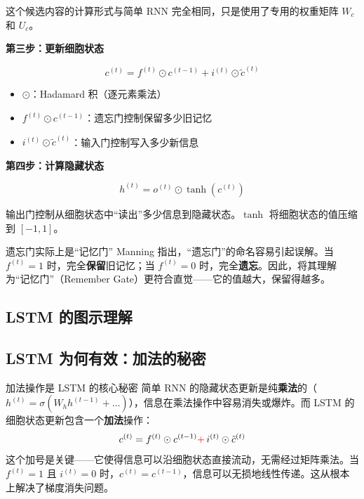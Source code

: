 \documentclass[a4paper]{article}
\begin{document}
这个候选内容的计算形式与简单 RNN 完全相同，只是使用了专用的权重矩阵 $W_c$ 和 $U_c$。

\textbf{第三步：更新细胞状态}

$$c^{(t)} = f^{(t)} \odot c^{(t-1)} + i^{(t)} \odot \tilde{c}^{(t)}$$

\begin{itemize}
    \item $\odot$：Hadamard 积（逐元素乘法）
    \item $f^{(t)} \odot c^{(t-1)}$：遗忘门控制保留多少旧记忆
    \item $i^{(t)} \odot \tilde{c}^{(t)}$：输入门控制写入多少新信息
\end{itemize}

\textbf{第四步：计算隐藏状态}

$$h^{(t)} = o^{(t)} \odot \tanh(c^{(t)})$$

输出门控制从细胞状态中``读出''多少信息到隐藏状态。$\tanh$ 将细胞状态的值压缩到 $[-1, 1]$。

\begin{warningbox}{遗忘门实际上是``记忆门''}
Manning 指出，``遗忘门''的命名容易引起误解。当 $f^{(t)} = 1$ 时，完全\textbf{保留}旧记忆；当 $f^{(t)} = 0$ 时，完全\textbf{遗忘}。因此，将其理解为``记忆门''（Remember Gate）更符合直觉——它的值越大，保留得越多。
\end{warningbox}

\subsection{LSTM 的图示理解}







\subsection{LSTM 为何有效：加法的秘密}

\begin{importantbox}{加法操作是 LSTM 的核心秘密}
简单 RNN 的隐藏状态更新是纯\textbf{乘法}的（$h^{(t)} = \sigma(W_h h^{(t-1)} + \ldots)$），信息在乘法操作中容易消失或爆炸。而 LSTM 的细胞状态更新包含一个\textbf{加法}操作：
$$c^{(t)} = f^{(t)} \odot c^{(t-1)} \textcolor{red}{+} \, i^{(t)} \odot \tilde{c}^{(t)}$$
这个加号是关键——它使得信息可以沿细胞状态直接流动，无需经过矩阵乘法。当 $f^{(t)} = 1$ 且 $i^{(t)} = 0$ 时，$c^{(t)} = c^{(t-1)}$，信息可以无损地线性传递。这从根本上解决了梯度消失问题。
\end{importantbox}
\end{document}
